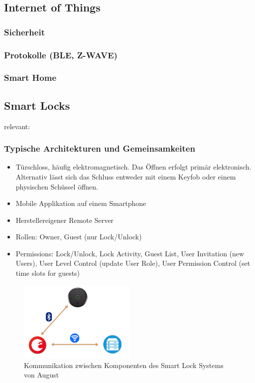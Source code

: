 \subsection{Internet of Things}
\label{sec:sota_iot}
\subsubsection{Sicherheit}
\label{sec:sota_iot_security}
\subsubsection{Protokolle (BLE, Z-WAVE)}
\label{sec:sota_iot_protocols}
\subsubsection{Smart Home}
\label{sec:sota_iot_smart_home}

\subsection{Smart Locks}
\label{sec:sota_smart_locks}

	relevant: \cite{Ye2017}\cite{Fuller2017}\cite{Rose2016}\cite{Ho2016}
	
	\subsubsection{Typische Architekturen und Gemeinsamkeiten}
		\begin{itemize}
			\item Türschloss, häufig elektromagnetisch. Das Öffnen erfolgt primär elektronisch. Alternativ lässt sich das Schluss entweder mit einem Keyfob oder einem physischen Schüssel öffnen.
			\item Mobile Applikation auf einem Smartphone
			\item Herstellereigener Remote Server
		\end{itemize}
		\begin{itemize}
			\item Rollen: Owner, Guest (nur Lock/Unlock)
			\item Permissions: Lock/Unlock, Lock Activity, Guest List, User Invitation (new Users), User Level Control (update User Role), User Permission Control (set time slots for guests)
		\end{itemize}
	
		\begin{figure}[H]
			\centering
			\includegraphics[width=0.5\textwidth]{paperNotes/ye2017_august}
			\caption{Kommunikation zwischen Komponenten des Smart Lock Systems von August}
			\label{fig:august}
		\end{figure}